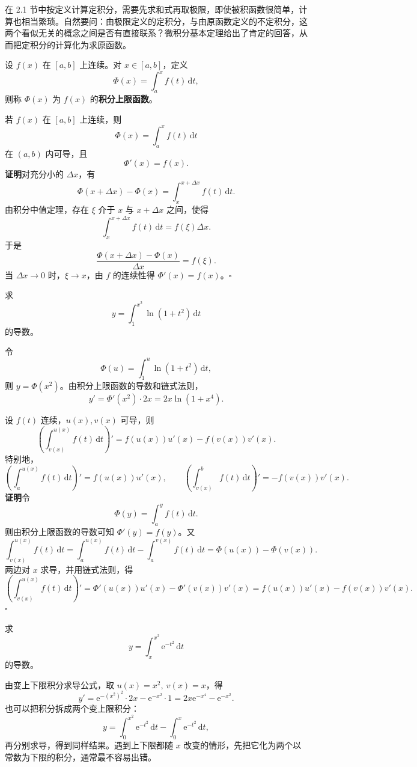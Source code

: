 \documentclass[fontset=fandol]{ctexart}
\newcommand{\dd}{\mathrm{d}}
\newcommand{\ee}{\mathrm{e}}
\begin{document}
在 2.1 节中按定义计算定积分，需要先求和式再取极限，即使被积函数很简单，计算也相当繁琐。自然要问：由极限定义的定积分，与由原函数定义的不定积分，这两个看似无关的概念之间是否有直接联系？微积分基本定理给出了肯定的回答，从而把定积分的计算化为求原函数。

\begin{definition}[积分上限函数]
设 $f(x)$ 在 $[a,b]$ 上连续。对 $x\in[a,b]$，定义
\[
\Phi(x)=\int_a^x f(t)\,\dd t,
\]
则称 $\Phi(x)$ 为 $f(x)$ 的\textbf{积分上限函数}。
\end{definition}

\begin{theorem}[积分上限函数的导数]
若 $f(x)$ 在 $[a,b]$ 上连续，则
\[
\Phi(x)=\int_a^x f(t)\,\dd t
\]
在 $(a,b)$ 内可导，且
\[
\Phi'(x)=f(x).
\]
\textbf{证明}\quad 对充分小的 $\Delta x$，有
\[
\Phi(x+\Delta x)-\Phi(x)=\int_x^{x+\Delta x}f(t)\,\dd t.
\]
由积分中值定理，存在 $\xi$ 介于 $x$ 与 $x+\Delta x$ 之间，使得
\[
\int_x^{x+\Delta x}f(t)\,\dd t=f(\xi)\Delta x.
\]
于是
\[
\frac{\Phi(x+\Delta x)-\Phi(x)}{\Delta x}=f(\xi).
\]
当 $\Delta x\to0$ 时，$\xi\to x$，由 $f$ 的连续性得 $\Phi'(x)=f(x)$。\hfill$\square$
\end{theorem}

\begin{example}[变上限积分求导]
求
\[
y=\int_1^{x^2}\ln(1+t^2)\,\dd t
\]
的导数。

令
\[
\Phi(u)=\int_1^u\ln(1+t^2)\,\dd t,
\]
则 $y=\Phi(x^2)$。由积分上限函数的导数和链式法则，
\[
y'=\Phi'(x^2)\cdot 2x=2x\ln(1+x^4).
\]
\end{example}

\begin{proposition}[变上下限积分求导]
设 $f(t)$ 连续，$u(x),v(x)$ 可导，则
\[
\left(\int_{v(x)}^{u(x)}f(t)\,\dd t\right)'
=f(u(x))u'(x)-f(v(x))v'(x).
\]
特别地，
\[
\left(\int_a^{u(x)}f(t)\,\dd t\right)'=f(u(x))u'(x),
\qquad
\left(\int_{v(x)}^b f(t)\,\dd t\right)'=-f(v(x))v'(x).
\]
\textbf{证明}\quad 令
\[
\Phi(y)=\int_a^y f(t)\,\dd t.
\]
则由积分上限函数的导数可知 $\Phi'(y)=f(y)$。又
\[
\int_{v(x)}^{u(x)}f(t)\,\dd t
=\int_a^{u(x)}f(t)\,\dd t-\int_a^{v(x)}f(t)\,\dd t
=\Phi(u(x))-\Phi(v(x)).
\]
两边对 $x$ 求导，并用链式法则，得
\[
\left(\int_{v(x)}^{u(x)}f(t)\,\dd t\right)'
=\Phi'(u(x))u'(x)-\Phi'(v(x))v'(x)
=f(u(x))u'(x)-f(v(x))v'(x).
\]
\noindent\hfill$\square$
\end{proposition}

\begin{example}[上下限都含 $x$]
求
\[
y=\int_x^{x^2} \ee^{-t^2}\,\dd t
\]
的导数。

由变上下限积分求导公式，取 $u(x)=x^2,\ v(x)=x$，得
\[
y'=\ee^{-(x^2)^2}\cdot 2x-\ee^{-x^2}\cdot 1
=2x \ee^{-x^4}-\ee^{-x^2}.
\]
也可以把积分拆成两个变上限积分：
\[
y=\int_0^{x^2}\ee^{-t^2}\,\dd t-\int_0^x \ee^{-t^2}\,\dd t,
\]
再分别求导，得到同样结果。遇到上下限都随 $x$ 改变的情形，先把它化为两个以常数为下限的积分，通常最不容易出错。
\end{example}
\end{document}
